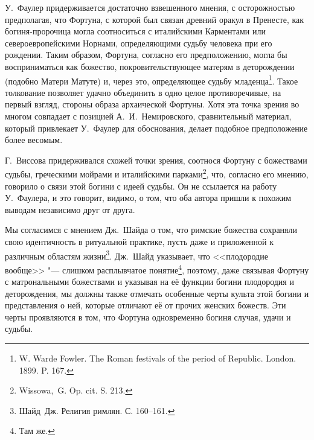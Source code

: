 У.~Фаулер придерживается достаточно взвешенного мнения, с осторожностью предполагая, что Фортуна, с которой был связан древний оракул в Пренесте, как богиня-пророчица могла соотноситься с италийскими Карментами или североевропейскими Норнами, определяющими судьбу человека при его рождении. Таким образом, Фортуна, согласно его предположению, могла бы восприниматься как божество, покровительствующее матерям в деторождении (подобно Матери Матуте) и, через это, определяющее судьбу младенца\footnote{W. Warde Fowler. The Roman festivals of the period of Republic. London. 1899. P. 167.}. Такое толкование позволяет удачно объединить в одно целое противоречивые, на первый взгляд, стороны образа архаической Фортуны. Хотя эта точка зрения во многом совпадает с позицией А.~И.~Немировского, сравнительный материал, который привлекает У.~Фаулер для обоснования, делает подобное предположение более весомым.

Г.~Виссова придерживался схожей точки зрения, соотнося Фортуну с божествами судьбы, греческими мойрами и италийскими парками\footnote{Wissowa,~G. Op. cit. S. 213.}, что, согласно его мнению, говорило о связи этой богини с идеей судьбы. Он не ссылается на работу У.~Фаулера, и это говорит, видимо, о том, что оба автора пришли к похожим выводам независимо друг от друга.

Мы согласимся с мнением Дж.~Шайда о том, что римские божества сохраняли свою идентичность в ритуальной практике, пусть даже и приложенной к различным областям жизни\footnote{Шайд~Дж. Религия римлян. С. 160--161.}. Дж.~Шайд указывает, что <<плодородие вообще>> "--- слишком расплывчатое понятие\footnote{Там же.}, поэтому, даже связывая Фортуну с матрональными божествами и указывая на её функции богини плодородия и деторождения, мы должны также отмечать особенные черты культа этой богини и представления о ней, которые отличают её от прочих женских божеств. Эти черты проявляются в том, что Фортуна одновременно богиня случая, удачи и судьбы. %

